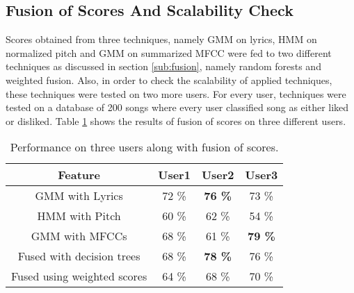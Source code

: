 \subsection{Fusion of Scores And Scalability Check} Scores obtained from three techniques, namely GMM on lyrics, HMM on normalized pitch and GMM on summarized MFCC were fed to two different techniques as discussed in section \ref{sub:fusion}, namely random forests and weighted fusion. Also, in order to check the scalability of applied techniques, these techniques were tested on two more users. For every user, techniques were tested on a database of 200 songs where every user classified song as either liked or disliked. Table \ref{tab:comb} shows the results of fusion of scores on three different users.
\begin{table}[!htbp]
\begin{center}
\begin{tabular}{ |c|c|c|c| } 
 \hline
  Feature & User1 & User2 & User3 \\ \hline
 GMM with Lyrics & 72 \% & \textbf{76 \%} & 73 \% \\ 
 HMM with Pitch & 60 \% & 62 \%  & 54 \% \\
 GMM with MFCCs & 68 \% & 61 \% & \textbf{79 \%} \\ \hline
 Fused with decision trees & 68 \% & \textbf{78 \%}   & 76 \% \\
 \hline
 Fused using weighted scores & 64 \% & 68 \%  & 70 \%\\
 \hline
\end{tabular}
\end{center}
\caption{Performance on three users along with fusion of scores.} \label{tab:comb}
\end{table}
